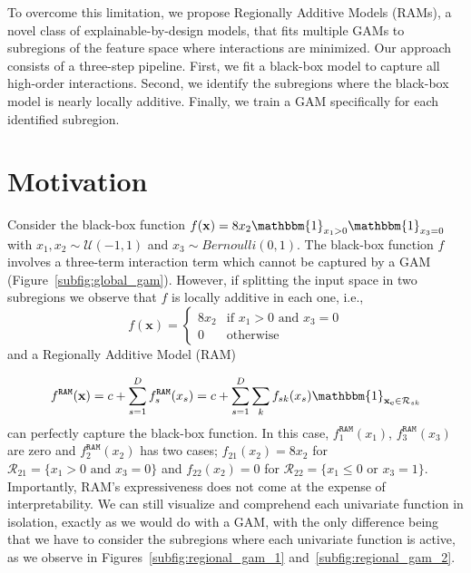 \documentclass[12pt]{article}
\newcommand{\xb}{\mathbf{x}}
\newcommand{\xc}{\mathbf{x_c}}
\newcommand{\when}[1]{\mathbbm{1}_{#1}}
\begin{document}
To overcome this limitation, we propose Regionally Additive Models (RAMs), a novel class of explainable-by-design models,
that fits multiple GAMs to subregions of the feature space where interactions are minimized.
Our approach consists of a three-step pipeline.
First, we fit a black-box model to capture all high-order interactions.
Second, we identify the subregions where the black-box model is nearly locally additive.
Finally, we train a GAM specifically for each identified subregion.

\section{Motivation}

Consider the black-box function
\(f(\xb) = 8x_2\when{x_1 > 0}\when{x_3=0}\) with \(x_1, x_2 \sim \mathcal{U}(-1,1)\) and \(x_3 \sim Bernoulli(0,1)\).
The black-box function $f$ involves a three-term interaction term which cannot be captured by a GAM (Figure~\ref{subfig:global_gam}).
However, if splitting the input space in two subregions we observe that $f$ is locally additive
in each one, i.e.,
%
\begin{equation}
    f(\xb) = \begin{cases} 8x_2 & \text{if } x_1 > 0 \text{ and } x_3 = 0 \\ 0 & \text{otherwise} \end{cases}
\end{equation}
%
and a Regionally Additive Model (RAM)

\begin{equation}
f^{\mathtt{RAM}}(\xb) = c + \sum_{s=1}^D f^{\mathtt{RAM}}_s(x_s) = c + \sum_{s=1}^D \sum_k f_{sk}(x_s) \when{\xc \in \mathcal{R}_{sk}}
\end{equation}
%
can perfectly capture the black-box function.
In this case, $f^{\mathtt{RAM}}_1(x_1)$, $f^{\mathtt{RAM}}_3(x_3)$ are zero and $f^{\mathtt{RAM}}_2(x_2)$ has two cases;
$f_{21}(x_2) = 8x_2$ for $\mathcal{R}_{21} = \{x_1 > 0 \text{ and } x_3 = 0\}$ and $f_{22}(x_2) = 0$ for $\mathcal{R}_{22} = \{x_1 \leq 0 \text{ or } x_3 = 1\}$.
Importantly, RAM's expressiveness does not come at the expense of interpretability.
We can still visualize and comprehend each univariate function in isolation, exactly as we would do with a GAM,
with the only difference being that we have to consider the subregions where each univariate function is active, as we observe in
Figures~\ref{subfig:regional_gam_1} and~\ref{subfig:regional_gam_2}.
\end{document}
